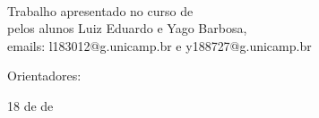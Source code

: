 \documentclass{tcc}
\begin{document}
\pagestyle{empty} %


\newpage
\begin{center}
\theauthor
\end{center}
\vspace{3in}
\begin{center}
\LARGE{\thetitle}\\
\end{center}

\vspace{2in}

\begin{flushright}
Trabalho apresentado no curso de \nomedocurso \\ pelos alunos Luiz Eduardo e Yago Barbosa, \\ emails: l183012@g.unicamp.br e y188727@g.unicamp.br \\ 

\vspace{0.2in}

Orientadores: \orientador


\end{flushright}


\vfill
\begin{center}
18 de \MONTH de \the\year
\end{center}


\newpage

\pagestyle{plain} %
\tableofcontents

\newpage




\renewcommand{\refname}{\centering REFERÊNCIAS} %

\nocite{*}



\end{document}
